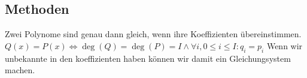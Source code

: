 \subsection{Methoden}
    Zwei Polynome sind genau dann gleich, wenn ihre Koeffizienten
    übereinstimmen.
    $Q(x) = P(x) \iff \deg(Q)=\deg(P)=I \land \forall i, 0 \leq i \leq I: q_i = p_i$
    Wenn wir unbekannte in den koeffizienten haben können wir damit ein
    Gleichungsystem machen.
